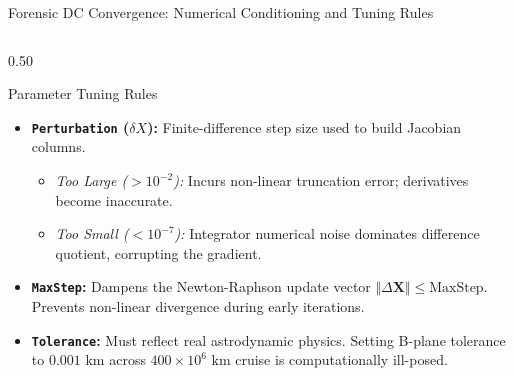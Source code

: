 \documentclass[aspectratio=169, 10pt]{beamer}
\begin{document}
\begin{frame}{Forensic DC Convergence: Numerical Conditioning and Tuning Rules}
    \begin{columns}[t]
        \begin{column}{0.50\textwidth}
            \begin{block}{Parameter Tuning Rules}
                \scriptsize
                \begin{itemize}\setlength{\itemsep}{2pt}
                    \item \textbf{\texttt{Perturbation} ($\delta X$):} Finite-difference step size used to build Jacobian columns.
                    \begin{itemize}\setlength{\itemsep}{0.5pt}
                        \item \textit{Too Large ($>10^{-2}$):} Incurs non-linear truncation error; derivatives become inaccurate.
                        \item \textit{Too Small ($<10^{-7}$):} Integrator numerical noise dominates difference quotient, corrupting the gradient.
                    \end{itemize}
                    \item \textbf{\texttt{MaxStep}:} Dampens the Newton-Raphson update vector $\Vert{}\Delta \mathbf{X}\Vert{} \le \text{MaxStep}$. Prevents non-linear divergence during early iterations.
                    \item \textbf{\texttt{Tolerance}:} Must reflect real astrodynamic physics. Setting B-plane tolerance to $0.001\text{ km}$ across $400\times 10^6\text{ km}$ cruise is computationally ill-posed.
                \end{itemize}
            \end{block}
        \end{column}


\end{columns}
\end{frame}
\end{document}

